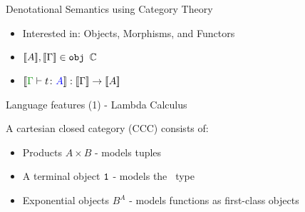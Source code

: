 \documentclass{beamer}
\newcommand\script[1]{}
\begin{document}
\begin{frame}{Denotational Semantics using Category Theory}
    \begin{itemize}
        \setlength\itemsep{3em}
        \item Interested in: Objects, Morphisms, and Functors
        \item ${\bf [\![}A{\bf ]\!]}, {\bf [\![}\Gamma{\bf ]\!]} \in\texttt{obj }\mathbb{C}$
        \item $\deno{\gtyperelation{t}{A}}: \deno{\G}\rightarrow \deno{A}$
    \end{itemize}


    \script{
        - In part II, we used domains to handle the semantics of non-termination. Lurking beneath this notion is the idea that we can use category theoretic structure to construct our denotations.

        - Here we map types and type environments to objects in a particular category, and correctly typed terms to morphisms (arrows) in the category.

        - One more structure we need is a functor - a map of objects to objects and morphisms to morphisms that preserves composition of terms.
    }
\end{frame}

\begin{frame}{Language features (1) - Lambda Calculus}

        A cartesian closed category (CCC) consists of:
        \begin{itemize}
            \setlength\itemsep{3em}
            \item Products $A\times B$ - models tuples
            \item A terminal object $\texttt{1}$ - models the \U\texttt{  }type
            \item Exponential objects $B^A$ - models functions as first-class objects
        \end{itemize}

        \script{
            Now let's look at what category theoretic structure you need to model different language features.
            
            - For lambda calculus style languages, you need at least a cartesian closed category.

            - In terms of the category of sets, this gives you sets of pairs of objects, sets of functions, and the single element set.

            - These are used to model pairs, lambda terms, giving us higher order functions, and the terminal, single element set allows us to interpret the unit type and ground terms.
        }
\end{frame}
\end{document}

